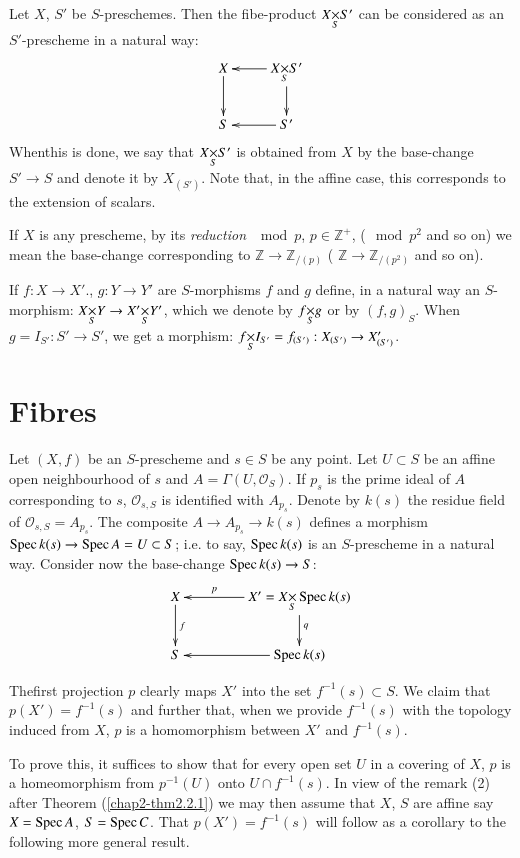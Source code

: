 Let $X$, $S'$ be $S$-preschemes. Then the fibe-product
$\fprod{X}{S'}{S}$ can be considered as an $S'$-prescheme in a natural
way:
\[
\xymatrix{
X\ar[d] & \fprod{X}{S'}{S}\ar[l]\ar[d]\\
S & \ar[l] S'
}
\]
When\pageoriginale this is done, we say that $\fprod{X}{S'}{S}$ is
obtained from $X$ by the base-change $S'\to S$ and denote it by
$X_{(S')}$. Note that, in the affine case, this corresponds to the
extension of scalars.

If $X$ is any prescheme, by its {\em reduction} $\mod p$,
$p\in\mathbb{Z}^{+}$, (\resp $\mod p^{2}$ and so on) we mean the
base-change corresponding to $\mathbb{Z}\to \mathbb{Z}_{/(p)}$ (\resp
$\mathbb{Z}\to \mathbb{Z}_{/(p^{2})}$ and so on).

If $f:X\to X'$., $g:Y\to Y'$ are $S$-morphisms $f$ and $g$ define, in
a natural way an $S$-morphism: $\fprod{X}{Y}{S}\to \fprod{X'}{Y'}{S}$,
which we denote by $\fprod{f}{g}{S}$ or by $(f,g)_{S}$. When
$g=I_{S'}:S'\to S'$, we get a morphism:
$\fprod{f}{I_{S'}}{S}=f_{(S')}:X_{(S')}\to X'_{(S')}$.

\section{Fibres}\label{chap2-sec2.3}

Let $(X,f)$ be an $S$-prescheme and $s\in S$ be any point. Let
$U\subset S$ be an affine open neighbourhood of $s$ and
$A=\Gamma(U,\mathscr{O}_{S})$. If $p_{s}$ is the prime ideal of $A$
corresponding to $s$, $\mathscr{O}_{s,S}$ is identified with
$A_{p_{s}}$. Denote by $k(s)$ the residue field of
$\mathscr{O}_{s,S}=A_{p_{s}}$. The composite $A\to A_{p_{s}}\to k(s)$
defines a morphism $\operatorname{Spec} k(s)\to \operatorname{Spec} A=U\subset S$; i.e. to say,
$\operatorname{Spec} k(s)$ is an $S$-prescheme in a natural way. Consider now the
base-change $\operatorname{Spec} k(s)\to S$:
\[
\xymatrix@C=1.5cm{
X\ar[d]^{f} & \ar[l]_-{p} X'=\fprod{X}{\Spec k(s)}{S}\ar[d]^{q}\\
S & \ar[l]\Spec k(s)
}
\]

The\pageoriginale first projection $p$ clearly maps $X'$ into the set
$f^{-1}(s)\subset S$. We claim that $p(X')=f^{-1}(s)$ and further
that, when we provide $f^{-1}(s)$ with the topology induced from $X$,
$p$ is a homomorphism between $X'$ and $f^{-1}(s)$.

To prove this, it suffices to show that for every open set $U$ in a
covering of $X$, $p$ is a homeomorphism from $p^{-1}(U)$ onto $U\cap
f^{-1}(s)$. In view of the remark (2) after Theorem
(\ref{chap2-thm2.2.1}) we may 
then assume that $X$, $S$ are affine say $X=\operatorname{Spec} A$, $S=\operatorname{Spec}
C$. That $p(X')=f^{-1}(s)$ will follow as a corollary to the following
more general result.

